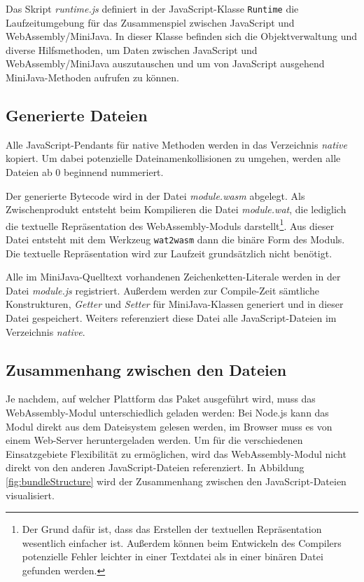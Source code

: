 Das Skript \emph{runtime.js} definiert in der JavaScript-Klasse \lstinline{Runtime} die Laufzeitumgebung für das Zusammenspiel zwischen JavaScript und WebAssembly/MiniJava. In dieser Klasse befinden sich die Objektverwaltung und diverse Hilfsmethoden, um Daten zwischen JavaScript und WebAssembly/MiniJava auszutauschen und um von JavaScript ausgehend MiniJava-Methoden aufrufen zu können.

\subsection{Generierte Dateien}

Alle JavaScript-Pendants für native Methoden werden in das Verzeichnis \emph{native} kopiert. Um dabei potenzielle Dateinamenkollisionen zu umgehen, werden alle Dateien ab 0 beginnend nummeriert.

Der generierte Bytecode wird in der Datei \emph{module.wasm} abgelegt. Als Zwischenprodukt entsteht beim Kompilieren die Datei \emph{module.wat}, die lediglich die textuelle Repräsentation des WebAssembly-Moduls darstellt\footnote{Der Grund dafür ist, dass das Erstellen der textuellen Repräsentation wesentlich einfacher ist. Außerdem können beim Entwickeln des Compilers potenzielle Fehler leichter in einer Textdatei als in einer binären Datei gefunden werden.}. Aus dieser Datei entsteht mit dem Werkzeug \lstinline{wat2wasm} \cite{WABT} dann die binäre Form des Moduls. Die textuelle Repräsentation wird zur Laufzeit grundsätzlich nicht benötigt.

Alle im MiniJava-Quelltext vorhandenen Zeichenketten-Literale werden in der Datei \emph{module.js} registriert. Außerdem werden zur Compile-Zeit sämtliche Konstrukturen, \emph{Getter} und \emph{Setter} für MiniJava-Klassen generiert und in dieser Datei gespeichert. Weiters referenziert diese Datei alle JavaScript-Dateien im Verzeichnis \emph{native}.

\subsection{Zusammenhang zwischen den Dateien}

Je nachdem, auf welcher Plattform das Paket ausgeführt wird, muss das WebAssembly-Modul unterschiedlich geladen werden: Bei Node.js kann das Modul direkt aus dem Dateisystem gelesen werden, im Browser muss es von einem Web-Server heruntergeladen werden. Um für die verschiedenen Einsatzgebiete Flexibilität zu ermöglichen, wird das WebAssembly-Modul nicht direkt von den anderen JavaScript-Dateien referenziert. In Abbildung \ref{fig:bundleStructure} wird der Zusammenhang zwischen den JavaScript-Dateien visualisiert.

